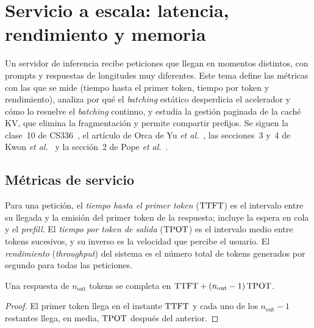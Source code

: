 \chapter{Servicio a escala: latencia, rendimiento y memoria}
\label{tema:6}

Un servidor de inferencia recibe peticiones que llegan en momentos distintos, con prompts y respuestas de longitudes muy diferentes. Este tema define las métricas con las que se mide (tiempo hasta el primer token, tiempo por token y rendimiento), analiza por qué el \emph{batching} estático desperdicia el acelerador y cómo lo resuelve el \emph{batching} continuo, y estudia la gestión paginada de la caché KV, que elimina la fragmentación y permite compartir prefijos. Se siguen la clase~10 de CS336~\cite{cs336}, el artículo de Orca de Yu \emph{et al.}~\cite{orca}, las secciones~3 y~4 de Kwon \emph{et al.}~\cite{kwon} y la sección~2 de Pope \emph{et al.}~\cite{pope}.

\section{Métricas de servicio}

\begin{definicion}\label{def:metricas}
Para una petición, el \emph{tiempo hasta el primer token} ($\mathrm{TTFT}$) es el intervalo entre su llegada y la emisión del primer token de la respuesta; incluye la espera en cola y el \emph{prefill}. El \emph{tiempo por token de salida} ($\mathrm{TPOT}$) es el intervalo medio entre tokens sucesivos, y su inverso es la velocidad que percibe el usuario. El \emph{rendimiento} (\emph{throughput}) del sistema es el número total de tokens generados por segundo para todas las peticiones.
\end{definicion}

\begin{proposicion}\label{prop:latencia}
Una respuesta de $n_{\mathrm{out}}$ tokens se completa en $\mathrm{TTFT}+(n_{\mathrm{out}}-1)\,\mathrm{TPOT}$.
\end{proposicion}

\begin{proof}
El primer token llega en el instante $\mathrm{TTFT}$ y cada uno de los $n_{\mathrm{out}}-1$ restantes llega, en media, $\mathrm{TPOT}$ después del anterior.
\end{proof}

